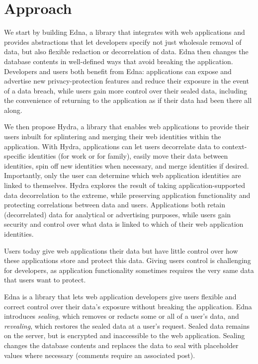 \section{Approach}
\label{sec:intro:approach}
We start by building Edna, a library that integrates with web applications and
provides abstractions that let developers specify not just wholesale removal of
data, but also flexible redaction or decorrelation of data. Edna then changes
the database contents in well-defined ways that avoid breaking the application.
Developers and users both benefit from Edna: applications can expose and
advertise new privacy-protection features and reduce their exposure in the event
of a data breach, while users gain more control over their sealed data,
including the convenience of returning to the application as if their data had
been there all along.

We then propose Hydra, a library that enables web applications to provide their
users inbuilt for splintering and merging their web identities within the
application. With Hydra, applications can let users decorrelate data to
context-specific identities (\eg for work or for family), easily
move their data between identities, spin off new identities when necessary, and
merge identities if desired. Importantly, only the user can determine which
web application identities are linked to themselves.
%
Hydra explores the result of taking application-supported data
decorrelation to the extreme, while preserving application functionality and
protecting correlations between data and users. Applications both retain
(decorrelated) data for \eg analytical or advertising purposes, while users gain
security and control over what data is linked to which of their web application
identities.

Users today give web applications their data but have little control over how
these applications store and protect this data.  Giving users control is
challenging for developers, as application functionality sometimes requires the
very same data that users want to protect.

Edna is a library that lets web application developers give users flexible and
correct control over their data’s exposure without breaking the application.
%
Edna introduces \emph{sealing}, which removes or redacts some or all of a user's
data, and \emph{revealing}, which restores the sealed data at a user's request.
Sealed data remains on the server, but is encrypted and inaccessible to the web
application. Sealing changes the database contents and replaces the data to seal
with placeholder values where necessary (\eg comments require an associated
post). 

